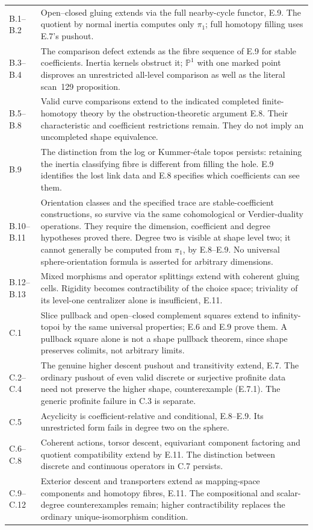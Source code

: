 \begin{longtable}{p{}p{}}
B.1--B.2 & Open--closed gluing extends via the full nearby-cycle functor, E.9. The quotient by normal inertia computes only $\pi_1$; full homotopy filling uses E.7's pushout.\\[2pt]
B.3--B.4 & The comparison defect extends as the fibre sequence of E.9 for stable coefficients. Inertia kernels obstruct it; $\mathbb P^1$ with one marked point disproves an unrestricted all-level comparison as well as the literal scan~129 proposition.\\[2pt]
B.5--B.8 & Valid curve comparisons extend to the indicated completed finite-homotopy theory by the obstruction-theoretic argument E.8. Their characteristic and coefficient restrictions remain. They do not imply an uncompleted shape equivalence.\\[2pt]
B.9 & The distinction from the log or Kummer-étale topos persists: retaining the inertia classifying fibre is different from filling the hole. E.9 identifies the lost link data and E.8 specifies which coefficients can see them.\\[2pt]
B.10--B.11 & Orientation classes and the specified trace are stable-coefficient constructions, so survive via the same cohomological or Verdier-duality operations. They require the dimension, coefficient and degree hypotheses proved there. Degree two is visible at shape level two; it cannot generally be computed from $\pi_1$, by E.8--E.9. No universal sphere-orientation formula is asserted for arbitrary dimensions.\\[2pt]
B.12--B.13 & Mixed morphisms and operator splittings extend with coherent gluing cells. Rigidity becomes contractibility of the choice space; triviality of its level-one centralizer alone is insufficient, E.11.\\[2pt]
C.1 & Slice pullback and open--closed complement squares extend to infinity-topoi by the same universal properties; E.6 and E.9 prove them. A pullback square alone is not a shape pullback theorem, since shape preserves colimits, not arbitrary limits.\\[2pt]
C.2--C.4 & The genuine higher descent pushout and transitivity extend, E.7. The ordinary pushout of even valid discrete or surjective profinite data need not preserve the higher shape, counterexample (E.7.1). The generic profinite failure in C.3 is separate.\\[2pt]
C.5 & Acyclicity is coefficient-relative and conditional, E.8--E.9. Its unrestricted form fails in degree two on the sphere.\\[2pt]
C.6--C.8 & Coherent actions, torsor descent, equivariant component factoring and quotient compatibility extend by E.11. The distinction between discrete and continuous operators in C.7 persists.\\[2pt]
C.9--C.12 & Exterior descent and transporters extend as mapping-space components and homotopy fibres, E.11. The compositional and scalar-degree counterexamples remain; higher contractibility replaces the ordinary unique-isomorphism condition.\\
\hline
\end{longtable}
\endgroup

